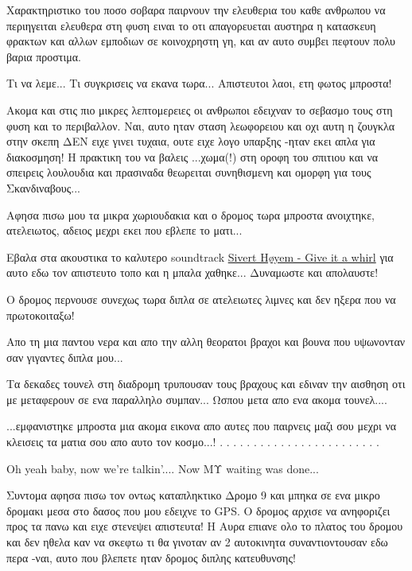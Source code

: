 Χαρακτηριστικο του ποσο σοβαρα παιρνουν την ελευθερια του καθε ανθρωπου να περιηγειται ελευθερα στη φυση ειναι το οτι απαγορευεται αυστηρα η κατασκευη φρακτων και αλλων εμποδιων σε κοινοχρηστη γη, και αν αυτο συμβει πεφτουν πολυ βαρια προστιμα.

Τι να λεμε... Τι συγκρισεις να εκανα τωρα... Απιστευτοι λαοι, ετη φωτος μπροστα!

Ακομα και στις πιο μικρες λεπτομερειες οι ανθρωποι εδειχναν το σεβασμο τους στη φυση και το περιβαλλον.
Ναι, αυτο ηταν σταση λεωφορειου και οχι αυτη η ζουγκλα στην σκεπη ΔΕΝ ειχε γινει τυχαια, ουτε ειχε λογο υπαρξης -ηταν εκει απλα για διακοσμηση! Η πρακτικη του να βαλεις ...χωμα(!) στη οροφη του σπιτιου και να σπειρεις λουλουδια και πρασιναδα θεωρειται συνηθισμενη και ομορφη για τους Σκανδιναβους... 


Αφησα πισω μου τα μικρα χωριουδακια και ο δρομος τωρα μπροστα ανοιχτηκε, ατελειωτος, αδειος μεχρι εκει που εβλεπε το ματι...


Εβαλα στα ακουστικα το καλυτερο soundtrack \href{http://goo.gl/xUsd7}{Sivert Høyem - Give it a whirl} για αυτο εδω τον απιστευτο τοπο και η μπαλα χαθηκε... 
Δυναμωστε και απολαυστε!


Ο δρομος περνουσε συνεχως τωρα διπλα σε ατελειωτες λιμνες και δεν ηξερα που να πρωτοκοιταξω! 


Απο τη μια παντου νερα και απο την αλλη θεορατοι βραχοι και βουνα που υψωνονταν σαν γιγαντες διπλα μου...


Τα δεκαδες τουνελ στη διαδρομη τρυπουσαν τους βραχους και εδιναν την αισθηση οτι με μεταφερουν σε ενα παραλληλο συμπαν...
Ωσπου μετα απο ενα ακομα τουνελ....


...εμφανιστηκε μπροστα μια ακομα εικονα απο αυτες που παιρνεις μαζι σου μεχρι να κλεισεις τα ματια σου απο αυτο τον κοσμο...!
.
.
.
.
.
.
.
.
.
.
.
.
.
.
.
.
.
.
.
.
.
.
.
.


Οh yeah baby, now we're talkin'....
Now ΜΥ waiting was done...


Συντομα αφησα πισω τον οντως καταπληκτικο Δρομο 9 και μπηκα σε ενα μικρο δρομακι μεσα στο δασος που μου εδειχνε το GPS. 
Ο δρομος αρχισε να ανηφοριζει προς τα πανω και ειχε στενεψει απιστευτα! Η Αυρα επιανε ολο το πλατος του δρομου και δεν ηθελα καν να σκεφτω τι θα γινοταν αν 2 αυτοκινητα συναντιοντουσαν εδω περα -ναι, αυτο που βλεπετε ηταν δρομος διπλης κατευθυνσης!

